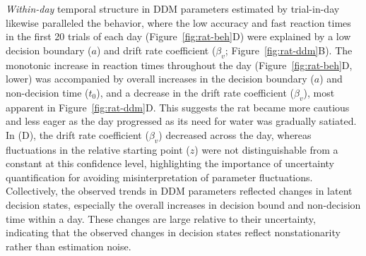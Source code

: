 \documentclass[00-main.tex]{subfiles}
\begin{document}
\emph{Within-day} temporal structure in DDM parameters estimated by trial-in-day likewise paralleled the behavior, where the low accuracy and fast reaction times in the first 20 trials of each day (Figure~\ref{fig:rat-beh}D) were explained by a low decision boundary ($a$) and drift rate coefficient ($\beta_v$; Figure~\ref{fig:rat-ddm}B). The monotonic increase in reaction times throughout the day (Figure~\ref{fig:rat-beh}D, lower) was accompanied by overall increases in the decision boundary ($a$) and non-decision time ($t_0$), and a decrease in the drift rate coefficient ($\beta_v$), most apparent in Figure~\ref{fig:rat-ddm}D. This suggests the rat became more cautious and less eager as the day progressed as its need for water was gradually satiated. In (D), the drift rate coefficient ($\beta_v$) decreased across the day, whereas fluctuations in the relative starting point ($z$) were not distinguishable from a constant at this confidence level, highlighting the importance of uncertainty quantification for avoiding misinterpretation of parameter fluctuations. Collectively, the observed trends in DDM parameters reflected changes in latent decision states, especially the overall increases in decision bound and non-decision time within a day. These changes are large relative to their uncertainty, indicating that the observed changes in decision states reflect nonstationarity rather than estimation noise.
\end{document}
